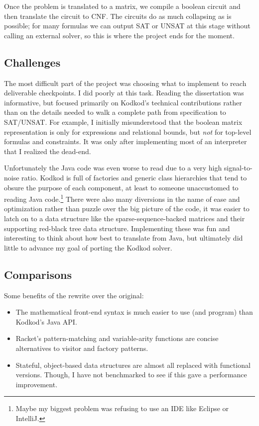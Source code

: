 Once the problem is translated to a matrix, we compile a boolean circuit and
 then translate the circuit to CNF.
The circuits do as much collapsing as is possible; for many formulas
 we can output SAT or UNSAT at this stage without calling an external solver,
 so this is where the project ends for the moment.


\subsection{Challenges}

The most difficult part of the project was choosing what to implement to
 reach deliverable checkpoints.
I did poorly at this task.
Reading the dissertation was informative, but focused primarily on Kodkod's
 technical contributions rather than on the details needed to walk a complete
 path from specification to SAT/UNSAT.
For example, I initially misunderstood that the boolean matrix representation
 is only for expressions and relational bounds, but \emph{not} for top-level
 formulas and constraints.
It was only after implementing most of an interpreter that I realized the dead-end.

Unfortunately the Java code was even worse to read due to a very high signal-to-noise
 ratio.
Kodkod is full of factories and generic class hierarchies that tend to obsure
 the purpose of each component, at least to someone unaccustomed to reading
 Java code.\footnote{Maybe my biggest problem was refusing to use an IDE like Eclipse or IntelliJ.}
There were also many diversions in the name of ease and optimization\textemdash
 rather than puzzle over the big picture of the code, it was easier to latch
 on to a data structure like the sparse-sequence-backed matrices and their
 supporting red-black tree data structure.
Implementing these was fun and interesting to think about how best to translate
 from Java, but ultimately did little to advance my goal of porting the Kodkod solver.


\subsection{Comparisons}

Some benefits of the rewrite over the original:
\begin{itemize}
\item The mathematical front-end syntax is much easier to use (and program)
 than Kodkod's Java API.
\item Racket's pattern-matching and variable-arity functions
 are concise alternatives to visitor and factory patterns.
\item Stateful, object-based data structures are almost all replaced with
 functional versions.
 Though, I have not benchmarked to see if this gave a performance improvement.
\end{itemize}

